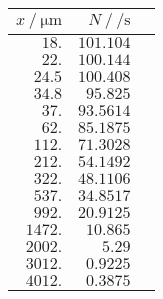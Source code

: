 \begin{tabular}{rrr}
	\toprule
	$x ~/~ \si{\micro\meter}$ & $N ~/~ \si{\per\second}$\\
	\midrule
	$\num{18.}$ & $\num{101.104}$ \\
	$\num{22.}$ & $\num{100.144}$ \\
	$\num{24.5}$ & $\num{100.408}$ \\
	$\num{34.8}$ & $\num{95.825}$ \\
	$\num{37.}$ & $\num{93.5614}$ \\
	$\num{62.}$ & $\num{85.1875}$ \\
	$\num{112.}$ & $\num{71.3028}$ \\
	$\num{212.}$ & $\num{54.1492}$ \\
	$\num{322.}$ & $\num{48.1106}$ \\
	$\num{537.}$ & $\num{34.8517}$ \\
	$\num{992.}$ & $\num{20.9125}$ \\
	$\num{1472.}$ & $\num{10.865}$ \\
	$\num{2002.}$ & $\num{5.29}$ \\
	$\num{3012.}$ & $\num{0.9225}$ \\
	$\num{4012.}$ & $\num{0.3875}$ \\
	\bottomrule
\end{tabular}
